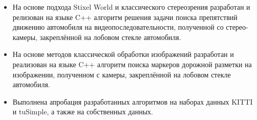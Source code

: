 \documentclass[aps,%
14pt,%
final,%
oneside,
onecolumn,%
musixtex, %
superscriptaddress,%
centertags]{extarticle} %
\begin{document}
\begin{itemize}
\item На основе подхода Stixel World и классического стереозрения разработан и релизован на языке C++ алгоритм решения задачи поиска препятствий движению автомобиля на видеопоследовательности, полученной со стерео-камеры, закреплённой на лобовом стекле автомобиля.

\item На основе методов классической обработки изображений разработан и реализован на языке C++ алгоритм поиска маркеров дорожной разметки на изображении, полученном с камеры, закреплённой на лобовом стекле автомобиля.

\item Выполнена апробация разработанных алгоритмов на наборах данных KITTI и tuSimple, а также на собственных данных.

\end{itemize}




\newpage



\end{document}
